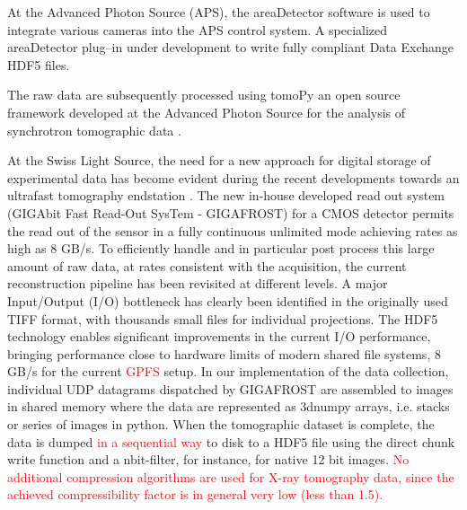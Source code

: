 \documentclass[pdf]{iucr}              %
\begin{document}
At the Advanced Photon Source (APS), the areaDetector software \cite{area_detector} is used to integrate various cameras into the APS control system. A specialized areaDetector plug--in under development to write fully compliant Data Exchange HDF5 files. 

The raw data are subsequently processed using tomoPy an open source framework developed at the Advanced Photon Source for the analysis of synchrotron tomographic data \cite{python_cpp}.

At the Swiss Light Source, the need for a new approach for digital storage of experimental data has become evident during the recent developments towards an ultrafast tomography endstation \cite{mokso2010}. The new in-house developed read out system (GIGAbit Fast Read-Out SysTem - GIGAFROST) for a CMOS detector permits the read out of the sensor in a fully continuous unlimited mode achieving rates as high as 8 GB/s. To efficiently handle and in particular post process this large amount of raw data, at rates consistent with the acquisition, the current reconstruction pipeline has been revisited at different levels. A major Input/Output (I/O) bottleneck has clearly been identified in the originally used TIFF format, with thousands small files for individual projections. The HDF5 technology enables significant improvements in the current I/O performance, bringing performance close to hardware limits of modern shared file systems, 8 GB/s for the current \textcolor{red} { GPFS} setup. In our implementation of the data collection, individual UDP datagrams dispatched by GIGAFROST are assembled to images in shared memory where the data are represented as 3dnumpy arrays, i.e. stacks or series of images in python. When the tomographic dataset is complete, the data is dumped \textcolor{red}{in a sequential way} to disk to a HDF5 file using the direct chunk write function \cite{donath2013} and a nbit-filter, for instance, for native 12 bit images. \textcolor{red}{ No additional compression algorithms are used for X-ray tomography data, since the achieved compressibility factor is in general very low (less than 1.5).}
\end{document}
